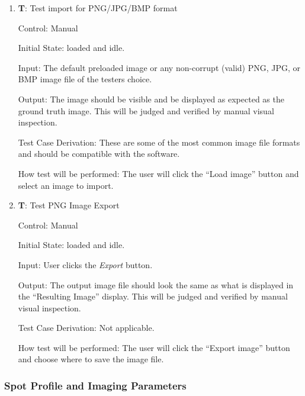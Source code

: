 \documentclass[12pt, titlepage]{article}
\newcounter{testnum} %
\begin{document}
\begin{enumerate}

  \item{\textbf{T\thetestnum \label{T_inputImage}}: Test import for PNG/JPG/BMP format\\}
            
  Control: Manual
            
  Initial State: \progname{} loaded and idle.
            
  Input: The default preloaded image or any non-corrupt (valid) PNG, JPG, or BMP image file of the testers choice.
            
  Output: The image should be visible and be displayed as expected as the ground truth image.
    This will be judged and verified by manual visual inspection.
            
  Test Case Derivation: These are some of the most common image file formats and should be compatible with the software.
            
  How test will be performed: The user will click the ``Load image'' button and select an image to import.

  \item{\textbf{T\thetestnum \label{T_exportImage}}: Test PNG Image Export\\}
              
  Control: Manual
            
  Initial State: \progname{} loaded and idle.
            
  Input: User clicks the \textit{Export} button.
            
  Output: The output image file should look the same as what is displayed in the ``Resulting Image'' display.
    This will be judged and verified by manual visual inspection.

  Test Case Derivation: Not applicable.

  How test will be performed: The user will click the ``Export image'' button and choose where to save the image file.

\end{enumerate}


\subsubsection{Spot Profile and Imaging Parameters} \label{subsec_spot}
\end{document}
